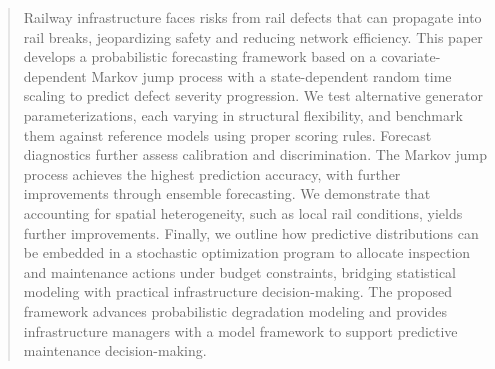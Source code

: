 
\begin{abstract}
Railway infrastructure faces risks from rail defects that can propagate into rail breaks, jeopardizing safety and reducing network efficiency. This paper develops a probabilistic forecasting framework based on a covariate-dependent Markov jump process with a state-dependent random time scaling to predict defect severity progression.
We test alternative generator parameterizations, each varying in structural flexibility, and benchmark them against reference models using proper scoring rules. Forecast diagnostics further assess calibration and discrimination.
The Markov jump process achieves the highest prediction accuracy, with further improvements through ensemble forecasting. We demonstrate that accounting for spatial heterogeneity, such as local rail conditions, yields further improvements. 
Finally, we outline how predictive distributions can be embedded in a stochastic optimization program to allocate inspection and maintenance actions under budget constraints, bridging statistical modeling with practical infrastructure decision-making. The proposed framework advances probabilistic degradation modeling and provides infrastructure managers with a model framework to support predictive maintenance decision-making.
\end{abstract}

